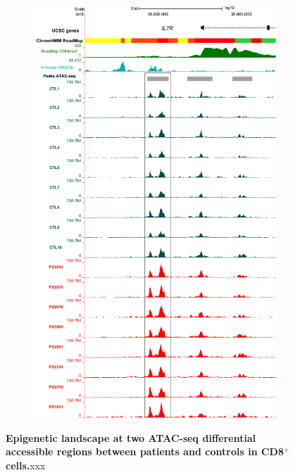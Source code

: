\begin{figure}[htbp]
\begin{subfigure}{0.5\textwidth}
\includegraphics[width=\textwidth]{./Results2/pdfs/UCSC_ATAC_CD8_normalised_peak_enh_IL7R}
\caption{\textbf{}}
\end{subfigure}
\caption[Epigenetic landscape at two ATAC-seq differential accessible regions between patients and controls in CD8$^+$ cells.]{\textbf{Epigenetic landscape at two ATAC-seq differential accessible regions between patients and controls in CD8$^+$ cells.}xxx}
\label{figure:ATAC_PS_CTL_CD8_TNFSF11_IL7R_tracks}
\end{figure} 


